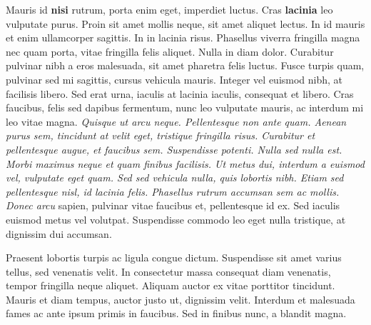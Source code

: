 \documentclass[12pt,a4paper]{report}
\begin{document}
{\color{emph} Mauris id\textbf{ nisi }rutrum, porta enim eget,  {\color{stress} imperdiet luctus. Cras \textbf{lacinia} leo} vulputate purus. Proin sit amet mollis neque, sit} amet aliquet lectus. In id mauris et enim ullamcorper sagittis. In in lacinia risus. Phasellus viverra fringilla magna  nec quam porta, vitae fringilla felis aliquet. Nulla in diam dolor. Curabitur pulvinar nibh a eros malesuada, sit amet pharetra felis luctus. Fusce turpis quam, pulvinar sed mi sagittis, cursus vehicula mauris. Integer vel euismod nibh, at facilisis libero. Sed erat urna, iaculis at lacinia iaculis, consequat et libero. Cras faucibus, felis sed dapibus fermentum, nunc leo vulputate mauris, ac interdum mi leo vitae magna.
\emph{
Quisque ut arcu neque. Pellentesque non ante quam. Aenean purus sem, tincidunt at velit eget, tristique fringilla risus. Curabitur et pellentesque augue, et faucibus sem. Suspendisse potenti. Nulla sed nulla est. Morbi maximus neque et quam finibus facilisis. Ut metus dui, interdum a euismod vel, vulputate eget quam. Sed sed vehicula nulla, quis lobortis nibh. Etiam sed pellentesque nisl, id lacinia felis. Phasellus rutrum accumsan sem ac mollis. Donec arcu }sapien, pulvinar vitae faucibus et, pellentesque id ex. Sed iaculis euismod metus vel volutpat. Suspendisse commodo leo eget nulla tristique, at dignissim dui accumsan.

Praesent lobortis turpis ac ligula congue dictum. Suspendisse sit amet varius tellus, sed venenatis\underline{} velit. In consectetur massa consequat diam venenatis, tempor fringilla neque aliquet. Aliquam auctor ex vitae porttitor tincidunt. Mauris et diam tempus, auctor justo ut, dignissim velit. Interdum et malesuada fames ac ante ipsum primis in faucibus. Sed in finibus nunc, a blandit magna. 
\end{document}
